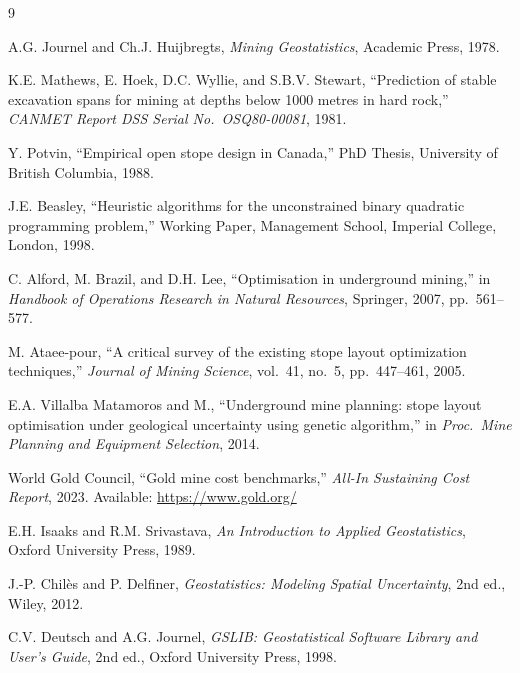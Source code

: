 \documentclass[12pt,a4paper]{article}
\begin{document}
\begin{thebibliography}{9}

A.G. Journel and Ch.J. Huijbregts, \textit{Mining Geostatistics}, Academic Press, 1978.

K.E. Mathews, E. Hoek, D.C. Wyllie, and S.B.V. Stewart, ``Prediction of stable excavation spans for mining at depths below 1000 metres in hard rock,'' \textit{CANMET Report DSS Serial No.\ OSQ80-00081}, 1981.

Y. Potvin, ``Empirical open stope design in Canada,'' PhD Thesis, University of British Columbia, 1988.

J.E. Beasley, ``Heuristic algorithms for the unconstrained binary quadratic programming problem,'' Working Paper, Management School, Imperial College, London, 1998.

C. Alford, M. Brazil, and D.H. Lee, ``Optimisation in underground mining,'' in \textit{Handbook of Operations Research in Natural Resources}, Springer, 2007, pp.\ 561--577.

M. Ataee-pour, ``A critical survey of the existing stope layout optimization techniques,'' \textit{Journal of Mining Science}, vol.\ 41, no.\ 5, pp.\ 447--461, 2005.

E.A. Villalba Matamoros and M., ``Underground mine planning: stope layout optimisation under geological uncertainty using genetic algorithm,'' in \textit{Proc.\ Mine Planning and Equipment Selection}, 2014.

World Gold Council, ``Gold mine cost benchmarks,'' \textit{All-In Sustaining Cost Report}, 2023. Available: \url{https://www.gold.org/}

E.H. Isaaks and R.M. Srivastava, \textit{An Introduction to Applied Geostatistics}, Oxford University Press, 1989.

J.-P. Chil\`{e}s and P. Delfiner, \textit{Geostatistics: Modeling Spatial Uncertainty}, 2nd ed., Wiley, 2012.

C.V. Deutsch and A.G. Journel, \textit{GSLIB: Geostatistical Software Library and User's Guide}, 2nd ed., Oxford University Press, 1998.

\end{thebibliography}
\end{document}
